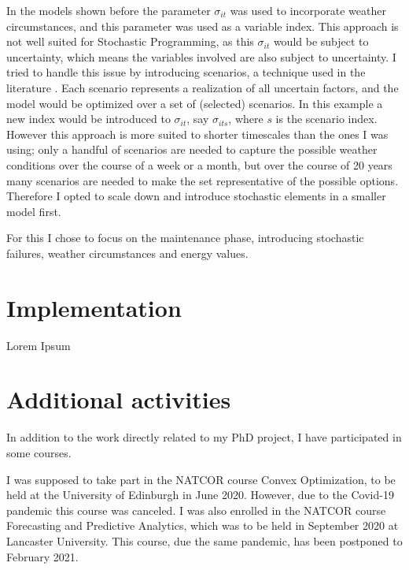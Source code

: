 \documentclass[a4paper,12pt]{article}
\begin{document}
In the models shown before the parameter $\sigma_{it}$ was used to incorporate weather circumstances, and this parameter was used as a variable index. This approach is not well suited for Stochastic Programming, as this $\sigma_{it}$ would be subject to uncertainty, which means the variables involved are also subject to uncertainty. I tried to handle this issue by introducing scenarios, a technique used in the literature \cite{besnard2011stochastic,de2012computational}. Each scenario represents a realization of all uncertain factors, and the model would be optimized over a set of (selected) scenarios. In this example a new index would be introduced to $\sigma_{it}$, say $\sigma_{its}$, where $s$ is the scenario index. However this approach is more suited to shorter timescales than the ones I was using; only a handful of scenarios are needed to capture the possible weather conditions over the course of a week or a month, but over the course of 20 years many scenarios are needed to make the set representative of the possible options. Therefore I opted to scale down and introduce stochastic elements in a smaller model first.

For this I chose to focus on the maintenance phase, introducing stochastic failures, weather circumstances and energy values. 

\pagebreak

\section{Implementation}\label{s:impl}
Lorem Ipsum 

\pagebreak

\section{Additional activities} \label{s:addit} %
In addition to the work directly related to my PhD project, I have participated in some courses. 

I was supposed to take part in the NATCOR course Convex Optimization, to be held at the University of Edinburgh in June 2020. However, due to the Covid-19 pandemic this course was canceled. I was also enrolled in the NATCOR course Forecasting and Predictive Analytics, which was to be held in September 2020 at Lancaster University. This course, due the same pandemic, has been postponed to February 2021. 

\bigskip
\end{document}
